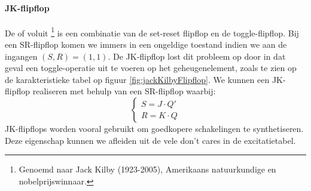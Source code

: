 \paragraph{JK-flipflop} De  of voluit \footnote{Genoemd naar Jack Kilby (1923-2005), Amerikaans natuurkundige en nobelprijswinnaar.} is een combinatie van de set-reset flipflop en de toggle-flipflop. Bij een SR-flipflop komen we immers in een ongeldige toestand indien we aan de ingangen $\left(S,R\right)=\left(1,1\right)$. De JK-flipflop lost dit probleem op door in dat geval een toggle-operatie uit te voeren op het geheugenelement, zoals te zien op de karakteristieke tabel op figuur \ref{fig:jackKilbyFlipflop}. We kunnen een JK-flipflop realiseren met behulp van een SR-flipflop waarbij:
\begin{equation}
\left\{\begin{array}{l}
S=J\cdot Q'\\
R=K\cdot Q
\end{array}\right.
\end{equation}
JK-flipflops worden vooral gebruikt om goedkopere schakelingen te synthetiseren. Deze eigenschap kunnen we afleiden uit de vele don't cares in de excitatietabel.
